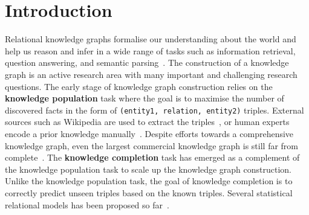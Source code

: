 
\section{Introduction}
\label{sec:intro}

Relational knowledge graphs formalise our understanding about the world
and help us reason and infer in a wide range of tasks such as information retrieval, question answering, and semantic parsing~\cite{Dong2015,jiang2015improving,kim2013context}.
The construction of a knowledge graph is an active research area with many important and challenging research questions.
The early stage of knowledge graph construction relies on the {\bf knowledge population} task
where the goal is to maximise the number of discovered facts in the form of \texttt{(entity1, relation, entity2)} triples.
External sources such as Wikipedia are used to extract the triples~\cite{hoffart2013yago2},
or human experts encode a prior knowledge manually~\cite{bollacker2008freebase}.
Despite efforts towards a comprehensive knowledge graph,
even the largest commercial knowledge graph is still far from complete~\cite{dong2014knowledge}.
The {\bf knowledge completion} task has emerged as a complement of the knowledge population task
to scale up the knowledge graph construction.
Unlike the knowledge population task, the goal of knowledge completion is to correctly predict unseen triples based on the known triples.
Several statistical relational models has been proposed so far~\cite{Lao2010,nickel2011three}.

